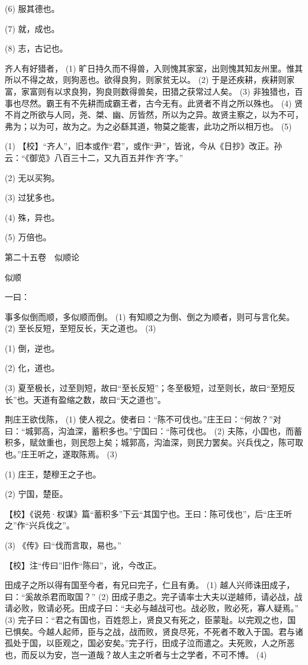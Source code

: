 \documentclass[12pt,UTF8]{ctexbook}
\begin{document}
(6) 服其德也。

(7) 就，成也。

(8) 志，古记也。

齐人有好猎者， (1) 旷日持久而不得兽，入则愧其家室，出则愧其知友州里。惟其所以不得之故，则狗恶也。欲得良狗，则家贫无以。 (2) 于是还疾耕，疾耕则家富，家富则有以求良狗，狗良则数得兽矣，田猎之获常过人矣。 (3) 非独猎也，百事也尽然。霸王有不先耕而成霸王者，古今无有。此贤者不肖之所以殊也。 (4) 贤不肖之所欲与人同，尧、桀、幽、厉皆然，所以为之异。故贤主察之，以为不可，弗为；以为可，故为之。为之必繇其道，物莫之能害，此功之所以相万也。 (5)

(1) 【校】“齐人”，旧本或作“君”，或作“尹”，皆讹，今从《日抄》改正。孙云：“《御览》八百三十二，又九百五并作‘齐’字。”

(2) 无以买狗。

(3) 过犹多也。

(4) 殊，异也。

(5) 万倍也。





第二十五卷　似顺论



似顺


一曰：

事多似倒而顺，多似顺而倒。 (1) 有知顺之为倒、倒之为顺者，则可与言化矣。 (2) 至长反短，至短反长，天之道也。 (3)

(1) 倒，逆也。

(2) 化，道也。

(3) 夏至极长，过至则短，故曰“至长反短”；冬至极短，过至则长，故曰“至短反长”也。天道有盈缩之数，故曰“天之道也”。

荆庄王欲伐陈， (1) 使人视之。使者曰：“陈不可伐也。”庄王曰：“何故？”对曰：“城郭高，沟洫深，蓄积多也。”宁国曰：“陈可伐也。 (2) 夫陈，小国也，而蓄积多，赋敛重也，则民怨上矣；城郭高，沟洫深，则民力罢矣。兴兵伐之，陈可取也。”庄王听之，遂取陈焉。 (3)

(1) 庄王，楚穆王之子也。

(2) 宁国，楚臣。

【校】《说苑·权谋》篇“蓄积多”下云“其国宁也。王曰：陈可伐也”，后“庄王听之”作“兴兵伐之”。

(3) 《传》曰“伐而言取，易也。”

【校】注“传曰”旧作“陈曰”，讹，今改正。

田成子之所以得有国至今者，有兄曰完子，仁且有勇。 (1) 越人兴师诛田成子，曰：“奚故杀君而取国？” (2) 田成子患之。完子请率士大夫以逆越师，请必战，战请必败，败请必死。田成子曰：“夫必与越战可也。战必败，败必死，寡人疑焉。” (3) 完子曰：“君之有国也，百姓怨上，贤良又有死之，臣蒙耻。以完观之也，国已惧矣。今越人起师，臣与之战，战而败，贤良尽死，不死者不敢入于国。君与诸孤处于国，以臣观之，国必安矣。”完子行，田成子泣而遣之。夫死败，人之所恶也，而反以为安，岂一道哉？故人主之听者与士之学者，不可不博。 (4)
\end{document}

